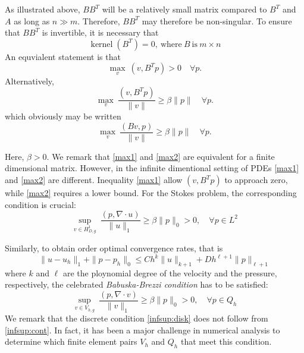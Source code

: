As illustrated above, $B B^T$ will be a relatively small matrix compared to
$B^T$ and $A$ as long as $n  \gg m$. Therefore, $B B^T$  may therefore be non-singular.
To ensure that $B B^T$ is invertible, it is necessary that
\[\operatorname{kernel}(B^T)=0,\ \textrm{where}\ B \ \textrm{is}\ m\times n\]
An equvialent statement is that
\begin{equation}
\max_v\ (v,B^Tp) > 0\quad \forall p .
\label{max1}
\end{equation}
Alternatively,
\begin{equation}
\max_v\ \frac{(v,B^Tp)}{\|v\| } \ge \beta \|p\| \quad \forall p.
\label{max2}
\end{equation}
which obviously may be written 
\begin{equation}
\max_v\ \frac{(B v,p)}{\|v\| } \ge \beta \|p\| \quad \forall p.
\label{max22}
\end{equation}

Here, $\beta > 0$. We remark that \eqref{max1} and \eqref{max2} are equivalent for a finite dimensional matrix.
However, in the infinite dimentional setting of PDEs \eqref{max1} and \eqref{max2} are different.
Inequality \eqref{max1} allow $(v, B^T p)$ to approach zero, while \eqref{max2} requires a lower bound.
For the Stokes problem, the corresponding condition is crucial:
\begin{equation}
\sup_{v\in H^1_{D,g}}\ \frac{(p, \nabla\cdot u) }{\|u\|_1\ } \ge \beta \|p\|_0 > 0, \quad  \forall p\in L^2
\label{infsup:cont}
\end{equation}

Similarly, to obtain order optimal convergence rates, that is
\[\|u-u_h\|_1 + \|p-p_h\|_0 \le Ch^k\|u\|_{k+1} + Dh^{\ell+1}\|p\|_{\ell+1}\]
where $k$ and $\ell$ are the ploynomial degree of the velocity and the pressure, respectively,
the celebrated \emph{Babuska-Brezzi condition} has to be satisfied:
\begin{equation}
\sup_{v\in V_{h,g}}\ \frac{(p, \nabla\cdot v) }{\|v\|_1\ } \ge \beta \|p\|_0 > 0, \quad  \forall p\in Q_h
\label{infsup:disk}
\end{equation}
We remark that the discrete condition \eqref{infsup:disk} does not follow from \eqref{infsup:cont}.
In fact, it has been a major challenge in numerical analysis
to determine which finite element pairs $V_h$ and $Q_h$ that meet this condition.

